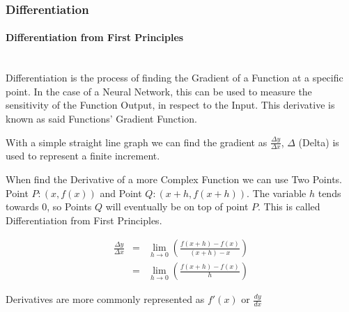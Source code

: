 \begin{flushleft}
            \subsubsection{Differentiation}
                \paragraph{Differentiation from First Principles}  \mbox{} \\
                    \vspace{0.2cm}
                    Differentiation is the process of finding the Gradient of a Function at a specific point. In the case of a Neural Network,
                    this can be used to measure the sensitivity of the Function Output, in respect to the Input. This derivative is known as said 
                    Functions' Gradient Function. \\
                    \vspace{0.2cm}
                    
                    With a simple straight line graph we can find the gradient as {\Large$\frac{\Delta y}{\Delta x}$, $\Delta$} (Delta) is used to 
                    represent a finite increment. \\
                    \vspace{0.2cm}

                    When find the Derivative of a more Complex Function we can use Two Points. Point $P : (x, f(x))$ and Point $Q : (x + h, f(x + h))$.
                    The variable $h$ tends towards 0, so Points $Q$ will eventually be on top of point $P$. This is called Differentiation from First
                    Principles.
                    \vspace{0.4cm}

                    \begin{eqnarray*}
                        \frac{\Delta y}{\Delta x} &=& \lim_{h\to0} \left(\frac{f(x + h) - f(x)}{(x + h) - x}\right) \\
                        &=& \lim_{h\to0} \left(\frac{f(x + h) - f(x)}{h}\right)
                    \end{eqnarray*}
                    \vspace{0.6cm}

                    Derivatives are more commonly represented as $f'(x)$ or $\frac{dy}{dx}$

                    \vspace{0.4cm}

\end{flushleft}
